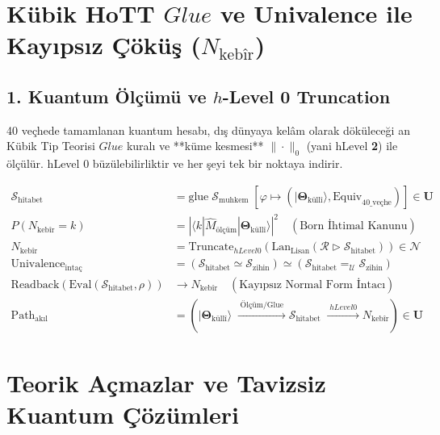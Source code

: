 \documentclass[11pt, a4paper]{article}
\begin{document}
\section{Kübik HoTT $Glue$ ve Univalence ile Kayıpsız Çöküş ($N_{\text{kebîr}}$)}

\subsection{1. Kuantum Ölçümü ve $h$-Level 0 Truncation}
40 veçhede tamamlanan kuantum hesabı, dış dünyaya kelâm olarak döküleceği an Kübik Tip Teorisi $Glue$ kuralı ve **küme kesmesi** $\|\cdot\|_0$ (yani hLevel \textbf{2}) ile ölçülür. hLevel 0 büzülebilirliktir ve her şeyi tek bir noktaya indirir.

\begin{align}
\mathcal{S}_{\text{hitabet}} &= \text{glue} \; \mathcal{S}_{\text{muhkem}} \; \left[ \varphi \mapsto (|\mathbf{\Theta}_{\text{küllî}}\rangle, \text{Equiv}_{\text{40\_veçhe}}) \right] \in \mathbf{U} \\
P(N_{\text{kebîr}} = k) &= \left| \langle k | \hat{M}_{\text{ölçüm}} |\mathbf{\Theta}_{\text{küllî}}\rangle \right|^2 \quad (\text{Born İhtimal Kanunu}) \\
N_{\text{kebîr}} &= \text{Truncate}_{hLevel 0}\left( \text{Lan}_{\text{Lisan}} \left( \mathcal{R} \triangleright \mathcal{S}_{\text{hitabet}} \right) \right) \in \mathcal{N} \\
\text{Univalence}_{\text{intaç}} &= (\mathcal{S}_{\text{hitabet}} \simeq \mathcal{S}_{\text{zihin}}) \simeq (\mathcal{S}_{\text{hitabet}} =_{\mathcal{U}} \mathcal{S}_{\text{zihin}}) \\
\text{Readback}(\text{Eval}(\mathcal{S}_{\text{hitabet}}, \rho)) &\longrightarrow N_{\text{kebîr}} \quad (\text{Kayıpsız Normal Form İntacı}) \\
\text{Path}_{\text{akıl}} &= \left( |\mathbf{\Theta}_{\text{küllî}}\rangle \;\xrightarrow{\;\text{Ölçüm/Glue}\;} \mathcal{S}_{\text{hitabet}} \;\xrightarrow{\;hLevel 0\;} N_{\text{kebîr}} \right) \in \mathbf{U}
\end{align}

\section{Teorik Açmazlar ve Tavizsiz Kuantum Çözümleri}
\end{document}
